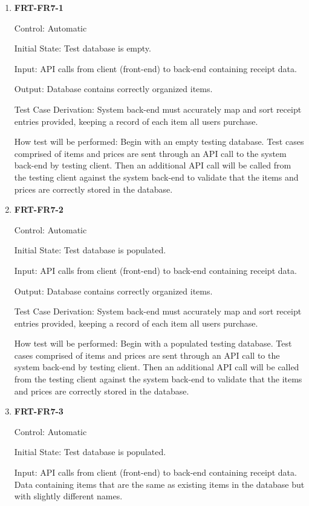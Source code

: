 \documentclass[12pt, titlepage]{article}
\begin{document}
\begin{enumerate}

\item{\textbf{FRT-FR7-1}}

Control: Automatic
          
Initial State: Test database is empty.

Input: API calls from client (front-end) to back-end containing receipt data.
          
Output: Database contains correctly organized items.

Test Case Derivation: System back-end must accurately map and sort receipt entries provided, keeping a record of each item all users purchase.
          
How test will be performed: Begin with an empty testing database. Test cases comprised of items and prices are sent through an API call to the system back-end by testing client. Then an additional API call will be called from the testing client against the system back-end to validate that the items and prices are correctly stored in the database.

\item{\textbf{FRT-FR7-2}}

Control: Automatic
          
Initial State: Test database is populated.

Input: API calls from client (front-end) to back-end containing receipt data.
          
Output: Database contains correctly organized items.

Test Case Derivation: System back-end must accurately map and sort receipt entries provided, keeping a record of each item all users purchase.
          
How test will be performed: Begin with a populated testing database. Test cases comprised of items and prices are sent through an API call to the system back-end by testing client. Then an additional API call will be called from the testing client against the system back-end to validate that the items and prices are correctly stored in the database.

\item{\textbf{FRT-FR7-3}}

Control: Automatic
          
Initial State: Test database is populated.

Input: API calls from client (front-end) to back-end containing receipt data. Data containing items that are the same as existing items in the database but with slightly different names.
          

\end{enumerate}
\end{document}
